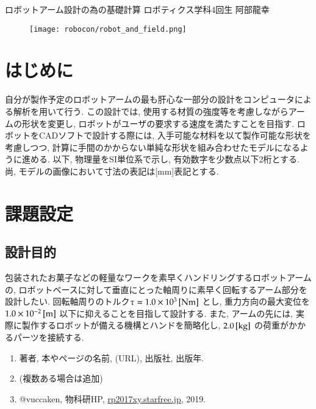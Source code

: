 \documentclass[10pt,b5paper,papersize,dvipdfmx]{jsbook}
\begin{document}

\setcounter{tocdepth}{2} %
\tableofcontents %
\setcounter{page}{0}
\clearpage %

\kaishititle%
  {ロボットアーム設計の為の基礎計算}%
  {ロボティクス学科4回生}%
  {阿部龍幸}%

\begin{figure}[htbp]
  \centering
  \texttt{[image: robocon/robot\_and\_field.png]}
\end{figure}

%
\section*{はじめに}
自分が製作予定のロボットアームの最も肝心な一部分の設計をコンピュータによる解析を用いて行う. この設計では, 使用する材質の強度等を考慮しながらアームの形状を変更し, ロボットがユーザの要求する速度を満たすことを目指す. ロボットをCADソフトで設計する際には, 入手可能な材料を以て製作可能な形状を考慮しつつ, 計算に手間のかからない単純な形状を組み合わせたモデルになるように進める. 以下, 物理量をSI単位系で示し, 有効数字を少数点以下2桁とする. 尚, モデルの画像において寸法の表記は[mm]表記とする. 

%
\section{課題設定}
\subsection{設計目的}
包装されたお菓子などの軽量なワークを素早くハンドリングするロボットアームの, ロボットベースに対して垂直にとった軸周りに素早く回転するアーム部分を設計したい. 回転軸周りのトルク$\tau =1.0 \times 10^3 \tani*{Nm}$ とし, 重力方向の最大変位を $1.0 \times 10^{-2} \tani*{m}$ 以下に抑えることを目指して設計する. また, アームの先には, 実際に製作するロボットが備える機構とハンドを簡略化し, $2.0 \tani*{kg}$ の荷重がかかるパーツを接続する.

\begin{sanko}
  \begin{enumerate}
    \item 著者, 本やページの名前, (URL), 出版社, 出版年.
    \item (複数ある場合は追加)
    \item @vuccaken, 物科研HP, \url{rp2017xy.starfree.jp}, 2019.
  \end{enumerate}
\end{sanko}
\end{document}
